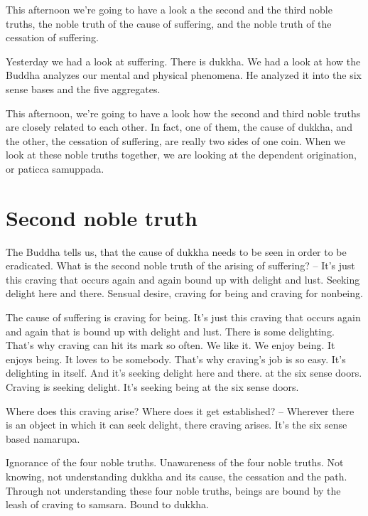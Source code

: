 \documentclass[letterpaper,10pt,english]{sphinxmanual}
\begin{document}
\sphinxAtStartPar
This afternoon we’re going to have a look a the second and the third
noble truths, the noble truth of the cause of suffering, and the noble truth of
the cessation of suffering.

\sphinxAtStartPar
Yesterday we had a look at suffering. There is dukkha. We had a look at
how the Buddha analyzes our mental and physical phenomena. He analyzed
it into the six sense bases and the five aggregates.

\sphinxAtStartPar
This afternoon, we’re going to have a look how the second and third
noble truths are closely related to each other. In fact, one of them, the cause
of dukkha, and the other, the cessation of suffering, are really two sides of
one coin. When we look at these noble truths together, we are looking at the
dependent origination, or paticca samuppada.


\section{Second noble truth}
\label{\detokenize{6-b:second-noble-truth}}
\sphinxAtStartPar
The Buddha tells us, that the cause of dukkha needs to be seen in order
to be eradicated. What is the second noble truth of the arising of suffering?
– It’s just this craving that occurs again and again bound up with delight and
lust. Seeking delight here and there. Sensual desire, craving for being and
craving for non\sphinxhyphen{}being.

\sphinxAtStartPar
The cause of suffering is craving for being. It’s just this craving that
occurs again and again that is bound up with delight and lust. There is some
  delighting. That’s why craving can hit its mark so often. We like it. We enjoy
being.  It  enjoys  being.  It  loves  to  be  somebody. That’s  why  craving’s  job
is so easy. It’s delighting in itself. And it’s seeking delight here and there.
at the six sense doors. Craving
is seeking delight. It’s seeking being at the six sense doors.

\sphinxAtStartPar
Where does this craving arise? Where does it get established? –
Wherever there is an object in which it
can seek delight, there craving arises. It’s the six sense based nama\sphinxhyphen{}rupa.

\sphinxAtStartPar
{}
Ignorance of the four noble
truths. Unawareness of the four noble truths. Not knowing, not understanding  dukkha  and  its  cause,  the  cessation  and  the  path.  Through  not  understanding these four noble truths, beings are bound by the leash of craving to
samsara. Bound to dukkha.
\end{document}
